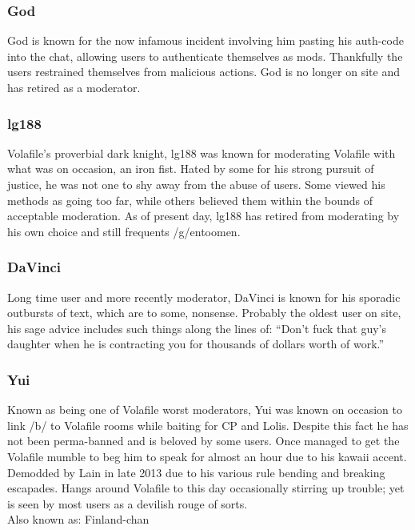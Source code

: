 \documentclass[12pt]{report}
\begin{document}
{{        \subsubsection{God}
        God is known for the now infamous incident involving him pasting
        his auth-code into the chat, allowing users to authenticate
        themselves as mods. Thankfully the users restrained themselves
        from malicious actions. God is no longer on site and has
        retired as a moderator.

        \subsubsection{lg188}
        Volafile's proverbial dark knight, lg188 was known for moderating
        Volafile with what was on occasion, an iron fist. Hated by some
        for his strong pursuit of justice, he was not one to shy away
        from the abuse of users. Some viewed his methods as going too far,
        while others believed them within the bounds of acceptable moderation.
        As of present day, lg188 has retired from moderating by his own
        choice and still frequents /g/entoomen.

        \subsubsection{DaVinci}
        Long time user and more recently moderator, DaVinci is known for his
        sporadic outbursts of text, which are to some, nonsense.
        Probably the oldest user on site, his sage advice includes such
        things along the lines of: ``Don't fuck that guy's daughter when
        he is contracting you for thousands of dollars worth of work.''

        \vfill
        \pagebreak

        \subsubsection{Yui}
        Known as being one of Volafile worst moderators, Yui was known on
        occasion to link /b/ to Volafile rooms while baiting for CP and Lolis.
        Despite this fact he has not been perma-banned and is beloved by
        some users. Once managed to get the Volafile mumble to beg him
        to speak for almost an hour due to his kawaii accent. Demodded by
        Lain in late 2013 due to his various rule bending and breaking escapades.
        Hangs around Volafile to this day occasionally stirring up trouble;
        yet is seen by most users as a devilish rouge of sorts.\\
	Also known as: Finland-chan

}}
\end{document}
